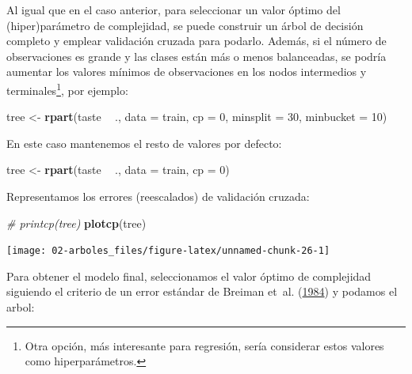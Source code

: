 \documentclass[
  spanish,
]{book}
\newenvironment{Shaded}{\begin{snugshade}}{\end{snugshade}}
\newcommand{\CommentTok}[1]{\textcolor[rgb]{0.56,0.35,0.01}{\textit{#1}}}
\newcommand{\DataTypeTok}[1]{\textcolor[rgb]{0.13,0.29,0.53}{#1}}
\newcommand{\DecValTok}[1]{\textcolor[rgb]{0.00,0.00,0.81}{#1}}
\newcommand{\KeywordTok}[1]{\textcolor[rgb]{0.13,0.29,0.53}{\textbf{#1}}}
\newcommand{\NormalTok}[1]{#1}
\newcommand{\OperatorTok}[1]{\textcolor[rgb]{0.81,0.36,0.00}{\textbf{#1}}}
\newcommand{\StringTok}[1]{\textcolor[rgb]{0.31,0.60,0.02}{#1}}
\theoremstyle{break}
\theoremstyle{definition}
\theoremstyle{definition}
\theoremstyle{definition}
\theoremstyle{remark}
\begin{document}
Al igual que en el caso anterior, para seleccionar un valor óptimo del (hiper)parámetro de complejidad, se puede construir un árbol de decisión completo y emplear validación cruzada para podarlo.
Además, si el número de observaciones es grande y las clases están más o menos balanceadas,
se podría aumentar los valores mínimos de observaciones en los nodos intermedios y terminales\footnote{Otra opción, más interesante para regresión, sería considerar estos valores como hiperparámetros.}, por ejemplo:

\begin{Shaded}
\begin{Highlighting}[]
\NormalTok{tree <-}\StringTok{ }\KeywordTok{rpart}\NormalTok{(taste }\OperatorTok{~}\StringTok{ }\NormalTok{., }\DataTypeTok{data =}\NormalTok{ train, }\DataTypeTok{cp =} \DecValTok{0}\NormalTok{, }\DataTypeTok{minsplit =} \DecValTok{30}\NormalTok{, }\DataTypeTok{minbucket =} \DecValTok{10}\NormalTok{)}
\end{Highlighting}
\end{Shaded}

En este caso mantenemos el resto de valores por defecto:

\begin{Shaded}
\begin{Highlighting}[]
\NormalTok{tree <-}\StringTok{ }\KeywordTok{rpart}\NormalTok{(taste }\OperatorTok{~}\StringTok{ }\NormalTok{., }\DataTypeTok{data =}\NormalTok{ train, }\DataTypeTok{cp =} \DecValTok{0}\NormalTok{)}
\end{Highlighting}
\end{Shaded}

Representamos los errores (reescalados) de validación cruzada:

\begin{Shaded}
\begin{Highlighting}[]
\CommentTok{# printcp(tree)}
\KeywordTok{plotcp}\NormalTok{(tree)}
\end{Highlighting}
\end{Shaded}

\begin{center}\texttt{[image: 02-arboles\_files/figure-latex/unnamed-chunk-26-1]} \end{center}

Para obtener el modelo final, seleccionamos el valor óptimo de complejidad siguiendo el criterio de un error estándar de Breiman et~al. (\protect\hyperlink{ref-breiman1984classification}{1984}) y podamos el arbol:
\end{document}
